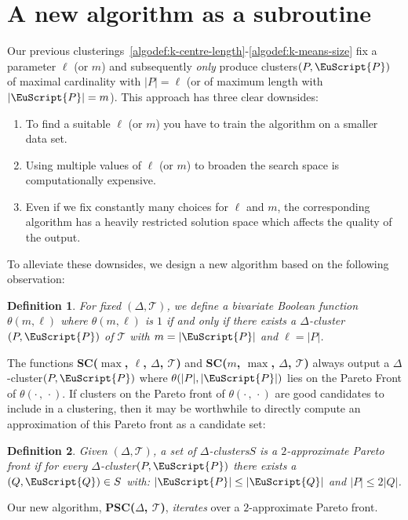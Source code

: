 \documentclass[11pt]{article}
\newcommand{\fancy}[1]{\EuScript{#1}}
\newcommand{\pathlet}{cluster\xspace}
\newcommand{\pathlets}{clusters\xspace}
\newtheorem{definition}{Definition}
\begin{document}
\section{A new algorithm as a subroutine}
\label{sec:pareto}
%
Our previous clusterings~\ref{algodef:k-centre-length}-\ref{algodef:k-means-size} fix a parameter $\ell$ (or $m$) and subsequently  \emph{only} produce \pathlets $(P, {\fancy{P}})$ of maximal cardinality with  $|P| = \ell$ (or of maximum length with $| {\fancy{P}}| = m$). 
%
This approach has three clear downsides:
%
\begin{enumerate}
    \item To find a suitable $\ell$ (or $m$) you have to train the algorithm on a smaller data set. 
    \item Using multiple values of $\ell$ (or $m$) to broaden the search space is computationally expensive. 
    \item Even if we fix constantly many choices for $\ell$ and $m$, the corresponding algorithm has a heavily restricted solution space which affects the quality of the output. 
\end{enumerate}
%
\noindent
To alleviate these downsides, we design a new algorithm based on the following observation: 
%
\begin{definition}
    For fixed $(\Delta, \mathcal{T})$, we define a bivariate Boolean function $\theta(m, \ell)$ where $\theta(m, \ell)$ is $1$ if and only if there exists a $\Delta$-\pathlet $(P, {\fancy{P}})$ of $\mathcal{T}$ with $m = |{\fancy{P}}|$ and $\ell = |P|$.  
\end{definition}
%
\noindent
The functions \textbf{SC($\max$, $\ell$, $\Delta$, $\mathcal{T}$)} and
\textbf{SC($m$, $\max$, $\Delta$, $\mathcal{T}$)} always output a $\Delta$-\pathlet $(P, {\fancy{P}})$ where $\theta(|P|, |{\fancy{P}}|)$ lies on the Pareto Front of $\theta(\cdot \, , \,  \cdot)$. 
If \pathlets on the Pareto front of $\theta(\cdot \, , \,  \cdot)$ are good candidates to include in a clustering, then it may be worthwhile to directly compute an approximation of this Pareto front as a candidate set:
%
\begin{definition}
    Given $(\Delta, \mathcal{T})$, a set of $\Delta$-\pathlets $S$ is a $2$-approximate Pareto front if for every $\Delta$-\pathlet $(P, {\fancy{P}})$ there exists a $(Q, {\fancy{Q}}) \in S$ with:
    $|{\fancy{P}}| \leq |{\fancy{Q}}| $ and $|P| \leq 2 |Q|$.
\end{definition}
%
\noindent
Our new algorithm,  \textbf{PSC($\Delta$, $\mathcal{T}$)}, \emph{iterates} over a $2$-approximate Pareto front. 
\end{document}
